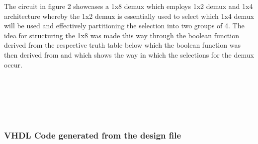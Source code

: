 \documentclass[12pt]{article}
\begin{document}
\noindent The circuit in figure 2 showcases a 1x8 demux which employs 1x2 demux and 1x4 architecture whereby the 1x2 demux is essentially used to select which 1x4 demux will be used and effectively partitioning the selection into two groups of 4.
The idea for structuring the 1x8 was made this way through the boolean function derived from the respective truth table below which the boolean function was then derived from and which shows the way in which the selections for the demux occur. 
\\
\\
\\
\\
\\
\\

\subsubsection{VHDL Code generated from the design file}
\end{document}
